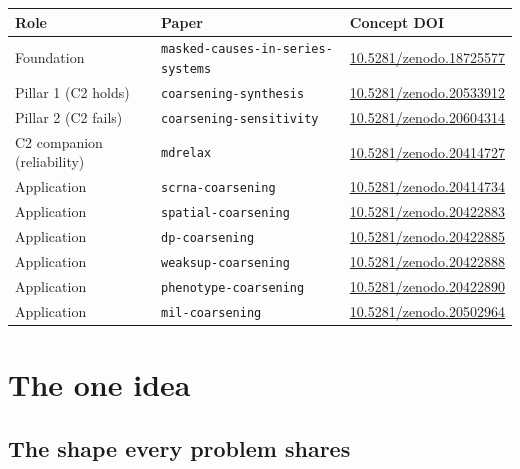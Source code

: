 \documentclass[11pt]{article}
\begin{document}
\begin{table}[h]
\centering\small
\begin{tabular}{@{}lll@{}}
\toprule
\textbf{Role} & \textbf{Paper} & \textbf{Concept DOI} \\
\midrule
Foundation & \texttt{masked-causes-in-series-systems} & \href{https://doi.org/10.5281/zenodo.18725577}{10.5281/zenodo.18725577} \\
Pillar 1 (C2 holds) & \texttt{coarsening-synthesis} & \href{https://doi.org/10.5281/zenodo.20533912}{10.5281/zenodo.20533912} \\
Pillar 2 (C2 fails) & \texttt{coarsening-sensitivity} & \href{https://doi.org/10.5281/zenodo.20604314}{10.5281/zenodo.20604314} \\
C2 companion (reliability) & \texttt{mdrelax} & \href{https://doi.org/10.5281/zenodo.20414727}{10.5281/zenodo.20414727} \\
Application & \texttt{scrna-coarsening} & \href{https://doi.org/10.5281/zenodo.20414734}{10.5281/zenodo.20414734} \\
Application & \texttt{spatial-coarsening} & \href{https://doi.org/10.5281/zenodo.20422883}{10.5281/zenodo.20422883} \\
Application & \texttt{dp-coarsening} & \href{https://doi.org/10.5281/zenodo.20422885}{10.5281/zenodo.20422885} \\
Application & \texttt{weaksup-coarsening} & \href{https://doi.org/10.5281/zenodo.20422888}{10.5281/zenodo.20422888} \\
Application & \texttt{phenotype-coarsening} & \href{https://doi.org/10.5281/zenodo.20422890}{10.5281/zenodo.20422890} \\
Application & \texttt{mil-coarsening} & \href{https://doi.org/10.5281/zenodo.20502964}{10.5281/zenodo.20502964} \\
\bottomrule
\end{tabular}
\end{table}

\section{The one idea}

\subsection{The shape every problem shares}
\end{document}
